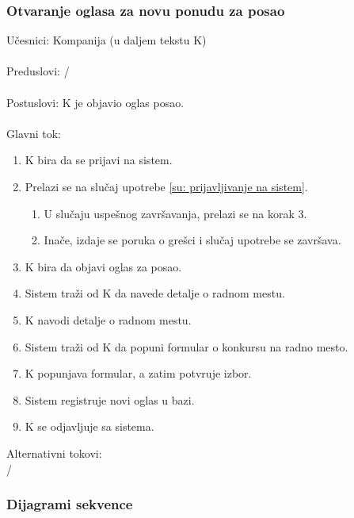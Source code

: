 \subsubsection{Otvaranje oglasa za novu ponudu za posao}
\label{su: otvaranje oglasa za novu ponudu za posao}

\noindent U\v cesnici: Kompanija (u daljem tekstu K)
\\
\\ Preduslovi: /
\\
\\ Postuslovi: K je objavio oglas posao.
\\ 
\\ Glavni tok:
\begin{enumerate}
	\item K bira da se prijavi na sistem.
	\item Prelazi se na slu\v caj upotrebe \ref{su: prijavljivanje na sistem}.
	\begin{enumerate}
		\item U slu\v caju uspe\v snog zavr\v savanja, prelazi se na korak 3.
		\item Ina\v ce, izdaje se poruka o gre\v sci i slu\v caj upotrebe se zavr\v sava.
	\end{enumerate}
	\item K bira da objavi oglas za posao.
	\item Sistem tra\v zi od K da navede detalje o radnom mestu.
	\item K navodi detalje o radnom mestu.
	\item Sistem tra\v zi od K da popuni formular o konkursu na radno mesto.
	\item K popunjava formular, a zatim potvr\dj uje izbor.
	\item Sistem registruje novi oglas u bazi.
	\item K se odjavljuje sa sistema.
\end{enumerate}

\noindent Alternativni tokovi: 
\\/

\subsubsection{Dijagrami sekvence}

